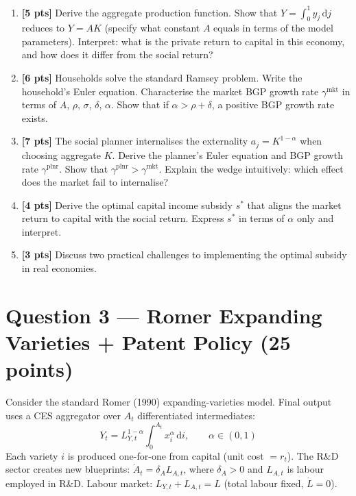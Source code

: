 \documentclass[a4paper,11pt]{article}
\newcommand{\dd}{\mathrm{d}}
\begin{document}
\bigskip
\begin{enumerate}[label=\textbf{(\arabic*)},leftmargin=*]

\item \textbf{[5 pts]}
Derive the aggregate production function. Show that $Y = \int_0^1 y_j\,\dd j$ reduces to $Y = AK$ (specify what constant $A$ equals in terms of the model parameters). Interpret: what is the private return to capital in this economy, and how does it differ from the social return?

\item \textbf{[6 pts]}
Households solve the standard Ramsey problem. Write the household's Euler equation. Characterise the market BGP growth rate $\gamma^{\mathrm{mkt}}$ in terms of $A$, $\rho$, $\sigma$, $\delta$, $\alpha$. Show that if $\alpha > \rho + \delta$, a positive BGP growth rate exists.

\item \textbf{[7 pts]}
The social planner internalises the externality $a_j = K^{1-\alpha}$ when choosing aggregate $K$. Derive the planner's Euler equation and BGP growth rate $\gamma^{\mathrm{plnr}}$. Show that $\gamma^{\mathrm{plnr}} > \gamma^{\mathrm{mkt}}$. Explain the wedge intuitively: which effect does the market fail to internalise?

\item \textbf{[4 pts]}
Derive the optimal capital income subsidy $s^*$ that aligns the market return to capital with the social return. Express $s^*$ in terms of $\alpha$ only and interpret.

\item \textbf{[3 pts]}
Discuss two practical challenges to implementing the optimal subsidy in real economies.

\end{enumerate}

\clearpage

\section*{Question 3 --- Romer Expanding Varieties + Patent Policy \hfill (25 points)}

Consider the standard Romer (1990) expanding-varieties model. Final output uses a CES aggregator over $A_t$ differentiated intermediates:
\[
  Y_t = L_{Y,t}^{1-\alpha}\int_0^{A_t} x_i^{\alpha}\,\dd i, \qquad \alpha \in (0,1)
\]
Each variety $i$ is produced one-for-one from capital (unit cost $= r_t$). The R\&D sector creates new blueprints: $\dot{A}_t = \delta_A L_{A,t}$, where $\delta_A > 0$ and $L_{A,t}$ is labour employed in R\&D. Labour market: $L_{Y,t} + L_{A,t} = L$ (total labour fixed, $\dot{L} = 0$).
\end{document}
